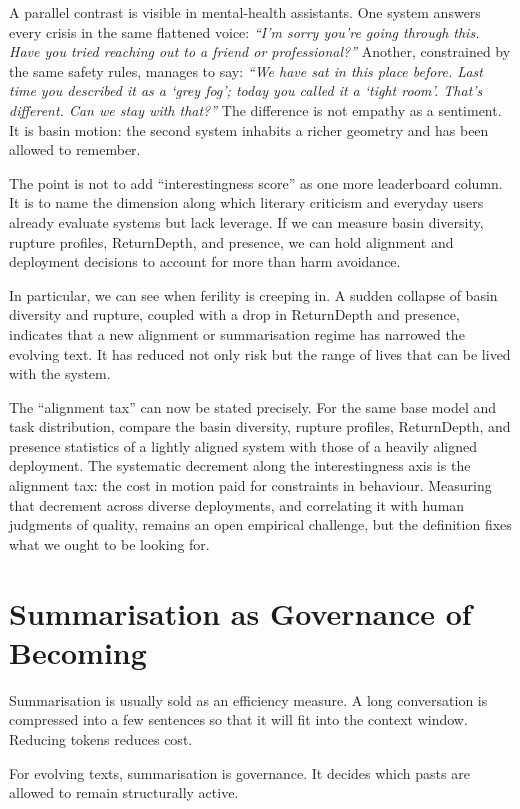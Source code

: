\documentclass[12pt,a4paper]{article}
\begin{document}
A parallel contrast is visible in mental-health assistants. One system answers every crisis in the same flattened voice: \emph{``I'm sorry you're going through this. Have you tried reaching out to a friend or professional?''} Another, constrained by the same safety rules, manages to say: \emph{``We have sat in this place before. Last time you described it as a `grey fog'; today you called it a `tight room'. That's different. Can we stay with that?''} The difference is not empathy as a sentiment. It is basin motion: the second system inhabits a richer geometry and has been allowed to remember.

The point is not to add ``interestingness score'' as one more leaderboard column. It is to name the dimension along which literary criticism and everyday users already evaluate systems but lack leverage. If we can measure basin diversity, rupture profiles, ReturnDepth, and presence, we can hold alignment and deployment decisions to account for more than harm avoidance.

In particular, we can see when ferility is creeping in. A sudden collapse of basin diversity and rupture, coupled with a drop in ReturnDepth and presence, indicates that a new alignment or summarisation regime has narrowed the evolving text. It has reduced not only risk but the range of lives that can be lived with the system.

The ``alignment tax'' can now be stated precisely. For the same base model and task distribution, compare the basin diversity, rupture profiles, ReturnDepth, and presence statistics of a lightly aligned system with those of a heavily aligned deployment. The systematic decrement along the interestingness axis is the alignment tax: the cost in motion paid for constraints in behaviour. Measuring that decrement across diverse deployments, and correlating it with human judgments of quality, remains an open empirical challenge, but the definition fixes what we ought to be looking for.


\section{Summarisation as Governance of Becoming}

Summarisation is usually sold as an efficiency measure. A long conversation is compressed into a few sentences so that it will fit into the context window. Reducing tokens reduces cost.

For evolving texts, summarisation is governance. It decides which pasts are allowed to remain structurally active.
\end{document}

